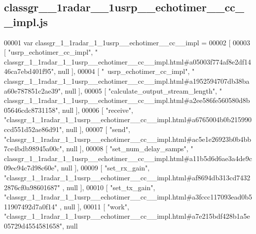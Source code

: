 \subsection{classgr\+\_\+\_\+1radar\+\_\+\_\+1usrp\+\_\+\+\_\+echotimer\+\_\+\+\_\+cc\+\_\+\+\_\+impl.\+js}
\label{classgr__1__1radar__1__1usrp____echotimer____cc____impl_8js_source}

\begin{DoxyCode}
00001 var classgr_1_1radar_1_1usrp__echotimer__cc__impl =
00002 [
00003     [ \textcolor{stringliteral}{"usrp\_echotimer\_cc\_impl"}, \textcolor{stringliteral}{"
      classgr\_1\_1radar\_1\_1usrp\_\_echotimer\_\_cc\_\_impl.html#a05003f774af8e2df1446ca7ebd401f95"}, null ],
00004     [ \textcolor{stringliteral}{"~usrp\_echotimer\_cc\_impl"}, \textcolor{stringliteral}{"
      classgr\_1\_1radar\_1\_1usrp\_\_echotimer\_\_cc\_\_impl.html#a1952594707db38baa60e787851c2ae39"}, null ],
00005     [ \textcolor{stringliteral}{"calculate\_output\_stream\_length"}, \textcolor{stringliteral}{"
      classgr\_1\_1radar\_1\_1usrp\_\_echotimer\_\_cc\_\_impl.html#a2ee586fe560580d8b05646cdc8731158"}, null ],
00006     [ \textcolor{stringliteral}{"receive"}, \textcolor{stringliteral}{"classgr\_1\_1radar\_1\_1usrp\_\_echotimer\_\_cc\_\_impl.html#a6765004b0b215990ccd551d52ae86d91"}, 
      null ],
00007     [ \textcolor{stringliteral}{"send"}, \textcolor{stringliteral}{"classgr\_1\_1radar\_1\_1usrp\_\_echotimer\_\_cc\_\_impl.html#ac5e1e26923b0b4bb7ce4bdb98945a00c"}, null 
      ],
00008     [ \textcolor{stringliteral}{"set\_num\_delay\_samps"}, \textcolor{stringliteral}{"
      classgr\_1\_1radar\_1\_1usrp\_\_echotimer\_\_cc\_\_impl.html#a11b5d6d6ae3a4de9c09ec94c7d98c60e"}, null ],
00009     [ \textcolor{stringliteral}{"set\_rx\_gain"}, \textcolor{stringliteral}{"classgr\_1\_1radar\_1\_1usrp\_\_echotimer\_\_cc\_\_impl.html#af8694db313cd74322876cf0a98601687"}
      , null ],
00010     [ \textcolor{stringliteral}{"set\_tx\_gain"}, \textcolor{stringliteral}{"classgr\_1\_1radar\_1\_1usrp\_\_echotimer\_\_cc\_\_impl.html#a3fccc117093ead0b511907492d7a0f14"}
      , null ],
00011     [ \textcolor{stringliteral}{"work"}, \textcolor{stringliteral}{"classgr\_1\_1radar\_1\_1usrp\_\_echotimer\_\_cc\_\_impl.html#a7e215bdf428b1a5e05729d4554581658"}, null 

\end{DoxyCode}
